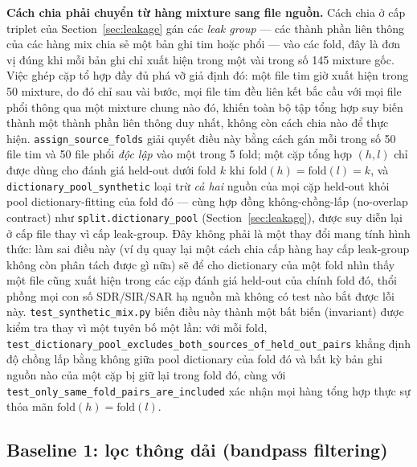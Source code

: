 \documentclass[11pt]{article}
\begin{document}
\textbf{Cách chia phải chuyển từ hàng mixture sang file nguồn.} Cách chia
ở cấp triplet của Section~\ref{sec:leakage} gán các \emph{leak group} ---
các thành phần liên thông của các hàng mix chia sẻ một bản ghi tim hoặc
phổi --- vào các fold, đây là đơn vị đúng khi mỗi bản ghi chỉ xuất hiện
trong một vài trong số 145 mixture gốc. Việc ghép cặp tổ hợp đầy đủ phá vỡ
giả định đó: một file tim giờ xuất hiện trong 50 mixture, do đó chỉ sau
vài bước, mọi file tim đều liên kết bắc cầu với mọi file phổi thông qua
một mixture chung nào đó, khiến toàn bộ tập tổng hợp suy biến thành một
thành phần liên thông duy nhất, không còn cách chia nào để thực hiện.
\texttt{assign\_source\_folds} giải quyết điều này bằng cách gán mỗi
trong số 50 file tim và 50 file phổi \emph{độc lập} vào một trong 5 fold;
một cặp tổng hợp $(h,l)$ chỉ được dùng cho đánh giá held-out dưới fold $k$
khi $\text{fold}(h) = \text{fold}(l) = k$, và
\texttt{dictionary\_pool\_synthetic} loại trừ \emph{cả hai} nguồn của mọi
cặp held-out khỏi pool dictionary-fitting của fold đó --- cùng hợp đồng
không-chồng-lấp (no-overlap contract) như \texttt{split.dictionary\_pool}
(Section~\ref{sec:leakage}), được suy diễn lại ở cấp file thay vì cấp
leak-group. Đây không phải là một thay đổi mang tính hình thức: làm sai
điều này (ví dụ quay lại một cách chia cấp hàng hay cấp leak-group không
còn phân tách được gì nữa) sẽ để cho dictionary của một fold nhìn thấy
một file cũng xuất hiện trong các cặp đánh giá held-out của chính fold
đó, thổi phồng mọi con số SDR/SIR/SAR hạ nguồn mà không có test nào bắt
được lỗi này. \texttt{test\_synthetic\_mix.py} biến điều này thành một
bất biến (invariant) được kiểm tra thay vì một tuyên bố một lần: với mỗi
fold, \texttt{test\_dictionary\_pool\_excludes\_both\_sources\_of\_held\_out\_pairs}
khẳng định độ chồng lấp bằng không giữa pool dictionary của fold đó và
bất kỳ bản ghi nguồn nào của một cặp bị giữ lại trong fold đó, cùng với
\texttt{test\_only\_same\_fold\_pairs\_are\_included} xác nhận mọi hàng
tổng hợp thực sự thỏa mãn $\text{fold}(h){=}\text{fold}(l)$.

\subsection{Baseline 1: lọc thông dải (bandpass filtering)}
\label{sec:baseline1}
\end{document}

